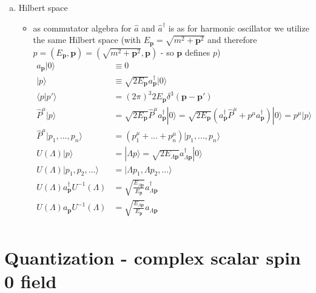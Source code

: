 \documentclass[10pt,a4paper]{report}
\theoremstyle{definition}
\begin{document}
\begin{enumerate}[a)]
\item Hilbert space
\begin{itemize}
\item as commutator algebra for $\hat{a}$ and $\hat{a}^\dagger$ is as for harmonic oscillator we utilize the same Hilbert space (with $E_\mathbf{p}=\sqrt{m^2+\mathbf{p}^2}$ and therefore $p=(E_\mathbf{p},\mathbf{p})=(\sqrt{m^2+\mathbf{p}^2},\mathbf{p})$ - so $\mathbf{p}$ defines $p$)
\begin{align}
a_\mathbf{p}|0\rangle&\equiv0\\
|p\rangle
&\equiv \sqrt{2E_\mathbf{p}}a^\dagger_\mathbf{p}|0\rangle\\
\langle p|p'\rangle&=(2\pi)^3 2E_\mathbf{p}\delta^3(\mathbf{p}-\mathbf{p}')\\
\hat{P}^\mu|p\rangle
&=\sqrt{2E_\mathbf{p}}\hat{P}^\mu a^\dagger_\mathbf{p}|0\rangle
=\sqrt{2E_\mathbf{p}}(a^\dagger_\mathbf{p}\hat{P}^\mu+p^\mu a^\dagger_\mathbf{p} )|0\rangle
=p^\mu|p\rangle\\
\hat{P}^\mu|p_1,...,p_n\rangle
&=(p^\mu_1+...+p^\mu_n)|p_1,...,p_n\rangle\\
U(\Lambda)|p\rangle
&=|\Lambda p\rangle
=\sqrt{2E_{\Lambda\mathbf{p}}}a^\dagger_{\Lambda\mathbf{p}}|0\rangle\\
U(\Lambda)|p_1,p_2,...\rangle&=|\Lambda p_1,\Lambda p_2,...\rangle\\
U(\Lambda)a^\dagger_\mathbf{p}U^{-1}(\Lambda)
&=\sqrt{\frac{E_{\Lambda\mathbf{p}}}{E_\mathbf{p}}}a^\dagger_{\Lambda\mathbf{p}}\\
U(\Lambda)a_\mathbf{p}U^{-1}(\Lambda)
&=\sqrt{\frac{E_{\Lambda\mathbf{p}}}{E_\mathbf{p}}}a_{\Lambda\mathbf{p}}\\
\end{align}

\end{itemize}
\end{enumerate}

\newpage
\section{Quantization - complex scalar spin 0 field}
\end{document}
